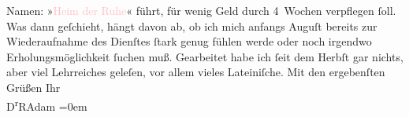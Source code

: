                     Namen: »\textcolor{pink}{Heim der Ruhe}{}\ledrightnote{\textcolor{pink}{Erholungsheim der Bundesbeamten}}« führt, für wenig Geld
                    durch 4 Wochen verpflegen ſoll. Was dann geſchieht, hängt davon ab, ob ich mich
                        anfangs Auguſt bereits zur Wiederaufnahme des Dienſtes ſtark
                    genug fühlen werde oder noch irgendwo Erholungsmöglichkeit ſuchen muß.\pend
           \pstart
           Gearbeitet habe ich ſeit dem Herbſt gar nichts, aber viel Lehrreiches
                    geleſen, vor allem vieles Lateiniſche.\pend
           \pstart
           {\pb}Mit den ergebenſten Grüßen\pend
           \pstart
           Ihr{\\[\baselineskip]}\spacefill\mbox{D\textsuperscript{r}RAdam}\pend
           \leftskip=0em{}\endnumbering{}  
      